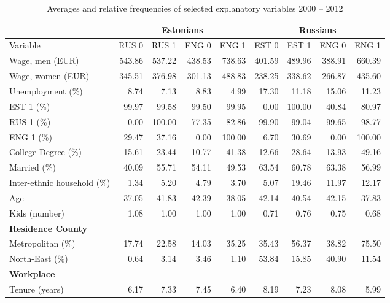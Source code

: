 \documentclass[12pt, a4paper]{article}
\begin{document}
\begin{table}
	\centering
	\caption{Averages and relative frequencies of selected explanatory
		variables 2000 -- 2012}
	\begin{tabular}{l|rrrr|rrrr}
		\toprule
		& \multicolumn{4}{c|}{Estonians}  &  \multicolumn{4}{c}{Russians}  \\ \midrule
		Variable          & RUS 0 & RUS 1 & ENG 0 & ENG 1 & EST 0 & EST 1 & ENG 0 & ENG 1 \\ \midrule
		Wage, men (EUR)       & 543.86 & 537.22 & 438.53 & 738.63 & 401.59 & 489.96 & 388.91 & 660.39 \\
		Wage, women (EUR)      & 345.51 & 376.98 & 301.13 & 488.83 & 238.25 & 338.62 & 266.87 & 435.60 \\
		Unemployment (\%)      & 8.74  & 7.13  & 8.83  & 4.99  & 17.30 & 11.18 & 15.06 & 11.23 \\
		EST 1 (\%)         & 99.97 & 99.58 & 99.50 & 99.95 & 0.00  & 100.00 & 40.84 & 80.97 \\
		RUS 1 (\%)         & 0.00  & 100.00 & 77.35 & 82.86 & 99.90 & 99.04 & 99.65 & 98.77 \\
		ENG 1 (\%)         & 29.47 & 37.16 & 0.00  & 100.00 & 6.70  & 30.69 & 0.00  & 100.00 \\
		College Degree (\%)     & 15.61 & 23.44 & 10.77 & 41.38 & 12.66 & 28.64 & 13.93 & 49.16 \\
		Married (\%)        & 40.09 & 55.71 & 54.11 & 49.53 & 63.54 & 60.78 & 63.38 & 56.99 \\
		Inter-ethnic household (\%) & 1.34  & 5.20  & 4.79  & 3.70  & 5.07  & 19.46 & 11.97 & 12.17 \\
		Age             & 37.05 & 41.83 & 42.39 & 38.05 & 42.14 & 40.54 & 42.15 & 37.83 \\
		Kids (number)        & 1.08  & 1.00  & 1.00  & 1.00  & 0.71  & 0.76  & 0.75  & 0.68  \\
		\textbf{Residence County } &    &    &    &    &    &    &    &    \\
		Metropolitan (\%)      & 17.74 & 22.58 & 14.03 & 35.25 & 35.43 & 56.37 & 38.82 & 75.50 \\
		North-East (\%)       & 0.64  & 3.14  & 3.46  & 1.10  & 53.84 & 15.85 & 40.90 & 11.54 \\
		\textbf{Workplace}     &    &    &    &    &    &    &    &    \\
		Tenure (years)       & 6.17  & 7.33  & 7.45  & 6.40  & 8.19  & 7.23  & 8.08  & 5.99  \\

\end{tabular}
\end{table}
\end{document}
